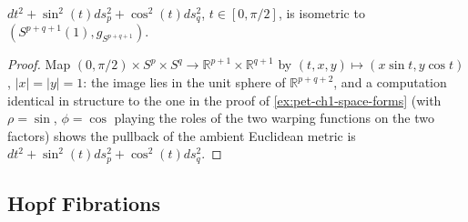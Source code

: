 \begin{example}
  \label{ex:pet-ch1-sphere-doubly-warped}
  \leanok
  $dt^2+\sin^2(t)ds_p^2+\cos^2(t)ds_q^2$, $t\in[0,\pi/2]$, is isometric to
  $(S^{p+q+1}(1),g_{S^{p+q+1}})$.
\end{example}
\begin{proof}
  \leanok
  Map $(0,\pi/2)\times S^p\times S^q\to\mathbb{R}^{p+1}\times\mathbb{R}^{q+1}$ by
  $(t,x,y)\mapsto(x\sin t,y\cos t)$, $|x|=|y|=1$: the image lies in the unit
  sphere of $\mathbb{R}^{p+q+2}$, and a computation identical in structure to the one
  in the proof of \cref{ex:pet-ch1-space-forms} (with $\rho=\sin$, $\phi=\cos$
  playing the roles of the two warping functions on the two factors) shows the
  pullback of the ambient Euclidean metric is
  $dt^2+\sin^2(t)ds_p^2+\cos^2(t)ds_q^2$.
\end{proof}

\subsection{Hopf Fibrations}

